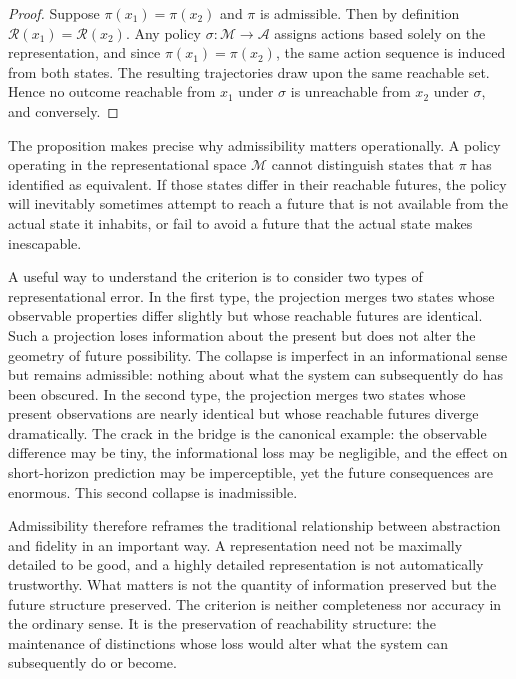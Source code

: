 \documentclass[12pt,a4paper]{article}
\theoremstyle{plain}
\theoremstyle{definition}
\theoremstyle{remark}
\begin{document}
\begin{proof}
Suppose $\pi(x_1) = \pi(x_2)$ and $\pi$ is admissible. Then by definition
$\mathcal{R}(x_1) = \mathcal{R}(x_2)$. Any policy $\sigma : \mathcal{M}
\rightarrow \mathcal{A}$ assigns actions based solely on the representation,
and since $\pi(x_1) = \pi(x_2)$, the same action sequence is induced from
both states. The resulting trajectories draw upon the same reachable set.
Hence no outcome reachable from $x_1$ under $\sigma$ is unreachable from
$x_2$ under $\sigma$, and conversely.
\end{proof}

The proposition makes precise why admissibility matters operationally. A
policy operating in the representational space $\mathcal{M}$ cannot
distinguish states that $\pi$ has identified as equivalent. If those states
differ in their reachable futures, the policy will inevitably sometimes
attempt to reach a future that is not available from the actual state it
inhabits, or fail to avoid a future that the actual state makes inescapable.

A useful way to understand the criterion is to consider two types of
representational error. In the first type, the projection merges two states
whose observable properties differ slightly but whose reachable futures are
identical. Such a projection loses information about the present but does not
alter the geometry of future possibility. The collapse is imperfect in an
informational sense but remains admissible: nothing about what the system can
subsequently do has been obscured. In the second type, the projection merges
two states whose present observations are nearly identical but whose reachable
futures diverge dramatically. The crack in the bridge is the canonical
example: the observable difference may be tiny, the informational loss may
be negligible, and the effect on short-horizon prediction may be
imperceptible, yet the future consequences are enormous. This second collapse
is inadmissible.

Admissibility therefore reframes the traditional relationship between
abstraction and fidelity in an important way. A representation need not be
maximally detailed to be good, and a highly detailed representation is not
automatically trustworthy. What matters is not the quantity of information
preserved but the future structure preserved. The criterion is neither
completeness nor accuracy in the ordinary sense. It is the preservation of
reachability structure: the maintenance of distinctions whose loss would alter
what the system can subsequently do or become.
\end{document}
